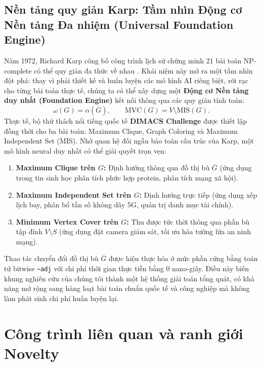 \documentclass[11pt,a4paper]{article}
\begin{document}
\subsection{Nền tảng quy giản Karp: Tầm nhìn Động cơ Nền tảng Đa nhiệm (Universal Foundation Engine)}
Năm 1972, Richard Karp công bố công trình lịch sử chứng minh 21 bài toán NP-complete có thể quy giản đa thức về nhau \citep{karp1972}. Khái niệm này mở ra một tầm nhìn đột phá: thay vì phải thiết kế và huấn luyện các mô hình AI riêng biệt, rời rạc cho từng bài toán thực tế, chúng ta có thể xây dựng một \textbf{Động cơ Nền tảng duy nhất (Foundation Engine)} kết nối thông qua các quy giản tính toán:
\begin{equation}
\omega(G) = \alpha(\overline{G}), \qquad \text{MVC}(G) = V \setminus \text{MIS}(G).
\end{equation}
Thực tế, bộ thử thách nổi tiếng quốc tế \textbf{DIMACS Challenge} được thiết lập đồng thời cho ba bài toán: Maximum Clique, Graph Coloring và Maximum Independent Set (MIS). Nhờ quan hệ đối ngẫu bảo toàn cấu trúc của Karp, một mô hình neural duy nhất có thể giải quyết trọn vẹn:
\begin{enumerate}[leftmargin=*]
    \item \textbf{Maximum Clique trên $G$:} Định hướng thông qua đồ thị bù $\overline{G}$ (ứng dụng trong tin sinh học phân tích phức hợp protein, phân tích mạng xã hội).
    \item \textbf{Maximum Independent Set trên $G$:} Định hướng trực tiếp (ứng dụng xếp lịch bay, phân bổ tần số không dây 5G, quản trị danh mục tài chính).
    \item \textbf{Minimum Vertex Cover trên $G$:} Thu được tức thời thông qua phần bù tập đỉnh $V \setminus S$ (ứng dụng đặt camera giám sát, tối ưu hóa tường lửa an ninh mạng).
\end{enumerate}
Thao tác chuyển đổi đồ thị bù $\overline{G}$ được hiện thực hóa ở mức phần cứng bằng toán tử bitwise \texttt{\~{}adj} với chi phí thời gian thực tiễn bằng $0$ nano-giây. Điều này biến khung nghiên cứu của chúng tôi thành một hệ thống giải toán tổng quát, có khả năng mở rộng sang hàng loạt bài toán chuẩn quốc tế và công nghiệp mà không làm phát sinh chi phí huấn luyện lại.

\section{Công trình liên quan và ranh giới Novelty}
\end{document}
